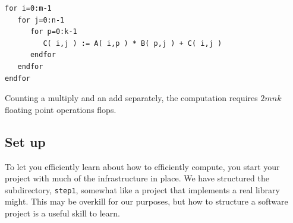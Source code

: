 \vspace{0.1in}
\begin{center}
\begin{minipage}{3in}
\begin{verbatim}
for i=0:m-1
   for j=0:n-1
      for p=0:k-1
         C( i,j ) := A( i,p ) * B( p,j ) + C( i,j )
      endfor
   endfor
endfor
\end{verbatim}
\end{minipage}
\end{center}
\vspace{0.1in}
Counting a multiply and an add separately,
the computation requires $ 2 m n k $  floating point operations flops.

\subsection{Set up}

To let you efficiently learn about how to efficiently compute, you
start your project with much of the infrastructure in place.  We have
structured the subdirectory, {\tt step1}, somewhat like a project that
implements a real library might.   This may be overkill for our
purposes, but how to structure a software project is a useful skill to learn.


